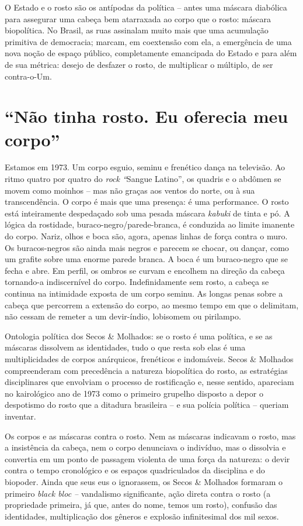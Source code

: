O Estado e o rosto são os antípodas da política -- antes uma máscara
diabólica para assegurar uma cabeça bem atarraxada ao corpo que o rosto:
máscara biopolítica. No Brasil, as ruas assinalam muito mais que uma
acumulação primitiva de democracia; marcam, em coextensão com ela, a
emergência de uma nova noção de espaço público, completamente emancipada
do Estado e para além de sua métrica: desejo de desfazer o rosto, de
multiplicar o múltiplo, de ser contra-o-Um.

\section{``Não tinha rosto. Eu oferecia meu corpo''}

Estamos em 1973. Um corpo esguio, seminu e frenético dança na televisão.
Ao ritmo quatro por quatro do \emph{rock ``}Sangue Latino'', os quadris
e o abdômen se movem como moinhos -- mas não graças aos ventos do norte,
ou à sua transcendência. O corpo é mais que uma presença: é uma
performance. O rosto está inteiramente despedaçado sob uma pesada
máscara \emph{kabuki} de tinta e pó. A lógica da rostidade,
buraco-negro/parede-branca, é conduzida ao limite imanente do corpo.
Nariz, olhos e boca são, agora, apenas linhas de força contra o muro. Os
buracos-negros são ainda mais negros e parecem se chocar, ou dançar,
como um grafite sobre uma enorme parede branca. A boca é um buraco-negro
que se fecha e abre. Em perfil, os ombros se curvam e encolhem na
direção da cabeça tornando-a indiscernível do corpo. Indefinidamente sem
rosto, a cabeça se continua na intimidade exposta de um corpo seminu. As
longas penas sobre a cabeça que percorrem a extensão do corpo, ao mesmo
tempo em que o delimitam, não cessam de remeter a um devir-índio,
lobisomem ou pirilampo.

Ontologia política dos Secos \& Molhados: se o rosto é uma política, e
se as máscaras dissolvem as identidades, tudo o que resta sob elas é uma
multiplicidades de corpos anárquicos, frenéticos e indomáveis. Secos \&
Molhados compreenderam com precedência a natureza biopolítica do rosto,
as estratégias disciplinares que envolviam o processo de rostificação e,
nesse sentido, apareciam no kairológico ano de 1973 como o primeiro
grupelho disposto a depor o despotismo do rosto que a ditadura
brasileira -- e sua polícia política -- queriam inventar.

Os corpos e as máscaras contra o rosto. Nem as máscaras indicavam o
rosto, mas a insistência da cabeça, nem o corpo denunciava o indivíduo,
mas o dissolvia e convertia em um ponto de passagem violenta de uma
força da natureza: o devir contra o tempo cronológico e os espaços
quadriculados da disciplina e do biopoder. Ainda que seus eus o
ignorassem, os Secos \& Molhados formaram o primeiro \emph{black bloc --
}vandalismo significante, ação direta contra o rosto (a propriedade
primeira, já que, antes do nome, temos um rosto), confusão das
identidades, multiplicação dos gêneros e explosão infinitesimal dos mil
sexos.

